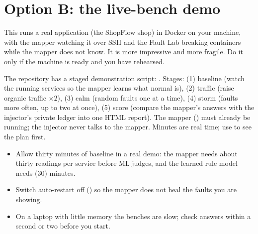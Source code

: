 \section{Option B: the live-bench demo}
\begin{simplebox}
This runs a real application (the ShopFlow shop) in Docker on your machine, with the mapper watching it over SSH and the Fault Lab breaking containers while the mapper does not know. It is more impressive and more fragile. Do it only if the machine is ready and you have rehearsed.
\end{simplebox}

\begin{techbox}
The repository has a staged demonstration script: . Stages: (1) baseline (watch the running services so the mapper learns what normal is), (2) traffic (raise organic traffic $\times2$), (3) calm (random faults one at a time), (4) storm (faults more often, up to two at once), (5) score (compare the mapper's answers with the injector's private ledger into one HTML report). The mapper () must already be running; the injector never talks to the mapper. Minutes are real time; use  to see the plan first.
\end{techbox}

\begin{warnbox}
\begin{itemize}
\item Allow thirty minutes of baseline in a real demo: the mapper needs about thirty readings per service before ML judges, and the learned rule model needs  (30) minutes.
\item Switch auto-restart off () so the mapper does not heal the faults you are showing.
\item On a laptop with little memory the benches are slow; check  answers within a second or two before you start.
\end{itemize}
\end{warnbox}

